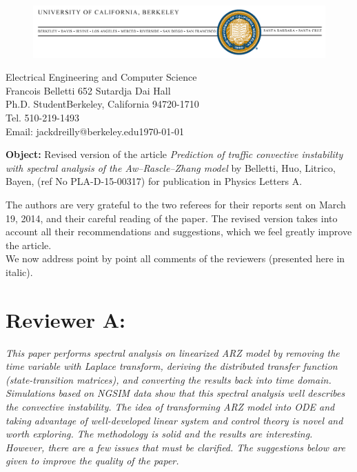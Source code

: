 \documentclass{article}
\begin{document}
\begin{figure}
\includegraphics[width=1\columnwidth]{berkeley-letterhead.jpg}
\end{figure}

\hfill{}Electrical Engineering and Computer Science \\
Francois Belletti \hfill{}652 Sutardja Dai Hall \\
Ph.D. Student\hfill{}\hfill{}Berkeley, California 94720-1710\\
Tel. 510-219-1493 \\
Email: jackdreilly@berkeley.edu\hfill{}\today

\bigskip{}

\bigskip{}
\textbf{Object:} Revised version of the article \textit{Prediction of traffic convective instability with spectral analysis of the Aw--Rascle--Zhang model}
 by Belletti, Huo, Litrico, Bayen, (ref No PLA-D-15-00317) for publication in Physics Letters A.

\bigskip{}

The authors are very grateful to the two referees for their
reports sent on March 19, 2014, and their careful reading of the
paper. The revised version takes into account all their recommendations
and suggestions, which we feel greatly improve the article.\\

We now address point by point all comments of the reviewers (presented
here in italic).

\bigskip{}


\section{Reviewer A:}

\emph{
This paper performs spectral analysis on linearized ARZ model by removing the time variable with Laplace transform, deriving the distributed transfer function (state-transition matrices), and converting the results back into time domain. Simulations based on NGSIM data show that this spectral analysis well describes the convective instability. The idea of transforming ARZ model into ODE and taking advantage of well-developed linear system and control theory is novel and worth exploring. The methodology is solid and the results are interesting. However, there are a few issues that must be clarified. The suggestions below are given to improve the quality of the paper.
}
\end{document}
